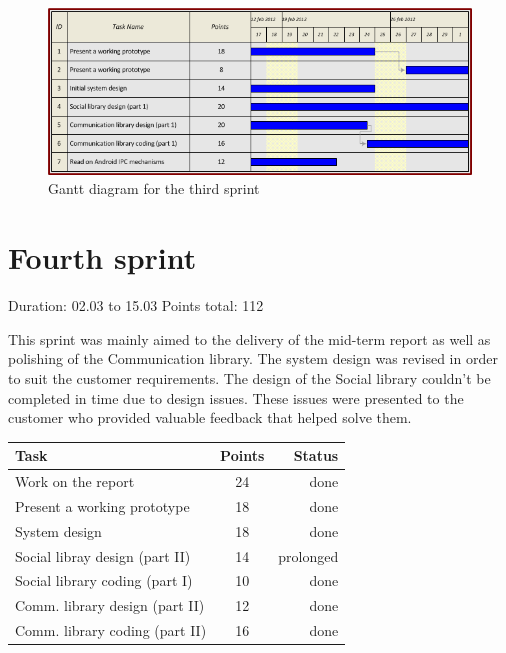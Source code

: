 \begin{figure}[h!]
\centering \includegraphics[scale=0.8]{img/sprints-gantt3.png}
\caption{Gantt diagram for the third sprint}
\label{fig:sprints-gantt3}
\end{figure}

\newpage


\section{Fourth sprint}

Duration: 02.03 to 15.03
Points total: 112

This sprint was mainly aimed to the delivery of the mid-term report as well
as polishing of the Communication library. The system design was revised in
order to suit the customer requirements. The design of the Social library couldn't
be completed in time due to design issues. These issues were presented to the
customer who provided valuable feedback that helped solve them.

\begin{table}[ht!]
\begin{tabular}{ | l | c | r | }

\hline
\textbf{Task} & \textbf{Points} & \textbf{Status} \\
\hline

Work on the report				& 24 & done \\
\hline
Present a working prototype		& 18 & done \\
\hline
System design					& 18 & done \\
\hline
Social libray design (part II)	& 14 & prolonged \\
\hline
Social library coding (part I)	& 10 & done \\
\hline
Comm. library design (part II)	& 12 & done \\
\hline
Comm. library coding (part II)	& 16 & done \\
\hline

\end{tabular}
\end{table}

